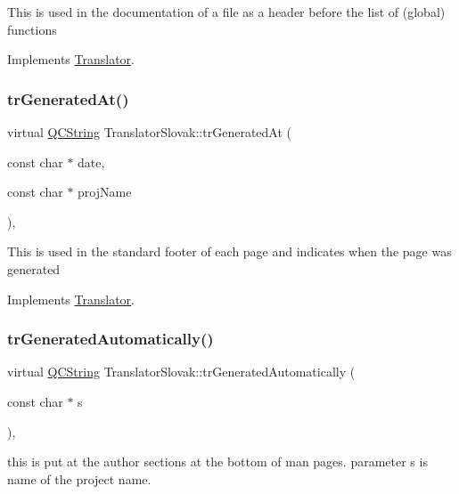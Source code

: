 This is used in the documentation of a file as a header before the list of (global) functions 

Implements \mbox{\hyperlink{class_translator}{Translator}}.

\mbox{\label{class_translator_slovak_a6cf6dfa882658177e2cc03e4a7be8f49}} 
\subsubsection{\texorpdfstring{trGeneratedAt()}{trGeneratedAt()}}
{\footnotesize\ttfamily virtual \mbox{\hyperlink{class_q_c_string}{Q\+C\+String}} Translator\+Slovak\+::tr\+Generated\+At (\begin{DoxyParamCaption}\item[{const char $\ast$}]{date,  }\item[{const char $\ast$}]{proj\+Name }\end{DoxyParamCaption})\hspace{0.3cm}{\ttfamily [inline]}, {\ttfamily [virtual]}}

This is used in the standard footer of each page and indicates when the page was generated 

Implements \mbox{\hyperlink{class_translator}{Translator}}.

\mbox{\label{class_translator_slovak_a8cdd1946ae9f60b859271f80a7b8adfa}} 
\subsubsection{\texorpdfstring{trGeneratedAutomatically()}{trGeneratedAutomatically()}}
{\footnotesize\ttfamily virtual \mbox{\hyperlink{class_q_c_string}{Q\+C\+String}} Translator\+Slovak\+::tr\+Generated\+Automatically (\begin{DoxyParamCaption}\item[{const char $\ast$}]{s }\end{DoxyParamCaption})\hspace{0.3cm}{\ttfamily [inline]}, {\ttfamily [virtual]}}

this is put at the author sections at the bottom of man pages. parameter s is name of the project name. 

